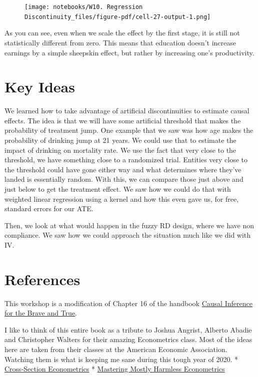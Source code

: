 \documentclass[
  letterpaper,
  DIV=11,
  numbers=noendperiod]{scrreprt}
\begin{document}
\begin{figure}[H]

{\centering \texttt{[image: notebooks/W10. Regression Discontinuity\_files/figure-pdf/cell-27-output-1.png]}

}

\end{figure}

As you can see, even when we scale the effect by the first stage, it is
still not statistically different from zero. This means that education
doesn't increase earnings by a simple sheepskin effect, but rather by
increasing one's productivity.

\hypertarget{key-ideas}{%
\section{Key Ideas}\label{key-ideas}}

We learned how to take advantage of artificial discontinuities to
estimate causal effects. The idea is that we will have some artificial
threshold that makes the probability of treatment jump. One example that
we saw was how age makes the probability of drinking jump at 21 years.
We could use that to estimate the impact of drinking on mortality rate.
We use the fact that very close to the threshold, we have something
close to a randomized trial. Entities very close to the threshold could
have gone either way and what determines where they've landed is
essentially random. With this, we can compare those just above and just
below to get the treatment effect. We saw how we could do that with
weighted linear regression using a kernel and how this even gave us, for
free, standard errors for our ATE.

Then, we look at what would happen in the fuzzy RD design, where we have
non compliance. We saw how we could approach the situation much like we
did with IV.

\hypertarget{references}{%
\section{References}\label{references}}

This workshop is a modification of Chapter 16 of the handbook
\href{https://github.com/matheusfacure/python-causality-handbook}{Causal
Inference for the Brave and True}.

I like to think of this entire book as a tribute to Joshua Angrist,
Alberto Abadie and Christopher Walters for their amazing Econometrics
class. Most of the ideas here are taken from their classes at the
American Economic Association. Watching them is what is keeping me sane
during this tough year of 2020. *
\href{https://www.aeaweb.org/conference/cont-ed/2017-webcasts}{Cross-Section
Econometrics} *
\href{https://www.aeaweb.org/conference/cont-ed/2020-webcasts}{Mastering
Mostly Harmless Econometrics}
\end{document}
